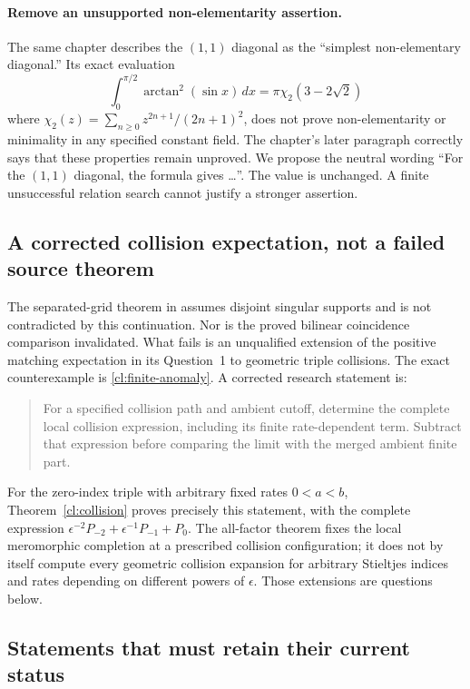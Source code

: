 \documentclass[11pt,a4paper]{article}
\numberwithin{equation}{section}
\theoremstyle{definition}
\theoremstyle{remark}
\begin{document}
\paragraph{Remove an unsupported non-elementarity assertion.}
The same chapter describes the $(1,1)$ diagonal as the
``simplest non-elementary diagonal.'' Its exact evaluation
\[
 \int_0^{\pi/2}\arctan^2(\sin x)\,dx
       =\pi\chi_2(3-2\sqrt2)
\]
where $\chi_2(z)=\sum_{n\ge0}z^{2n+1}/(2n+1)^2$,
does not prove non-elementarity or minimality in any specified
constant field. The chapter's later paragraph correctly says that
these properties remain unproved. We propose the neutral wording
``For the $(1,1)$ diagonal, the formula gives \dots''.
The value is unchanged. A finite unsuccessful relation search
cannot justify a stronger assertion.

\subsection{A corrected collision expectation, not a failed source theorem}

The separated-grid theorem in \cite{RepoExact} assumes disjoint
singular supports and is not contradicted by this continuation.
Nor is the proved bilinear coincidence comparison invalidated.
What fails is an unqualified extension of the positive matching
expectation in its Question~1 to geometric triple collisions.
The exact counterexample is \eqref{cl:finite-anomaly}.
A corrected research statement is:

\begin{quote}
For a specified collision path and ambient cutoff, determine the
complete local collision expression, including its finite
rate-dependent term. Subtract that expression before comparing
the limit with the merged ambient finite part.
\end{quote}

For the zero-index triple with arbitrary fixed rates $0<a<b$,
Theorem~\ref{cl:collision} proves precisely this statement, with
the complete expression
$\epsilon^{-2}P_{-2}+\epsilon^{-1}P_{-1}+P_0$.
The all-factor theorem fixes the local meromorphic completion at
a prescribed collision configuration; it does not by itself
compute every geometric collision expansion for arbitrary
Stieltjes indices and rates depending on different powers of
$\epsilon$. Those extensions are questions below.

\subsection{Statements that must retain their current status}
\end{document}
